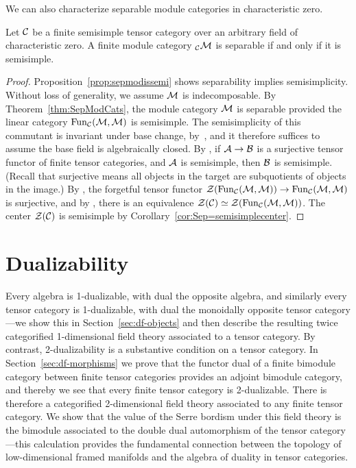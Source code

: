 \documentclass{amsart}
\begin{document}
We can also characterize separable module categories in characteristic zero.

\begin{proposition} \label{prop:SSModuleCatsAreSep}
Let $\mathcal C$ be a finite semisimple tensor category over an arbitrary field of characteristic zero.  A finite module category ${}_\mathcal C \mathcal M$ is separable if and only if it is semisimple.
\end{proposition}
\begin{proof}
Proposition~\ref{prop:sepmodissemi} shows separability implies semisimplicity.
Without loss of generality, we assume $\mathcal M$ is indecomposable.  By Theorem~\ref{thm:SepModCats}, the module category $\mathcal M$ is separable provided the linear category $\operatorname{Fun}_\mathcal C(\mathcal M,\mathcal M)$ is semisimple.  The semisimplicity of this commutant is invariant under base change, by~\cite[Lemma 5.2]{1002.0168}, and it therefore suffices to assume the base field is algebraically closed.  By \cite[Thm. 2.5]{EO-ftc}, if $\mathcal A \rightarrow \mathcal B$ is a surjective tensor functor of finite tensor categories, and $\mathcal A$ is semisimple, then $\mathcal B$ is semisimple.  (Recall that surjective means all objects in the target are subquotients of objects in the image.)  By \cite[Prop. 3.39]{EO-ftc}, the forgetful tensor functor $\mathcal Z(\operatorname{Fun}_\mathcal C(\mathcal M,\mathcal M)) \rightarrow \operatorname{Fun}_\mathcal C(\mathcal M,\mathcal M)$ is surjective, and by \cite[Cor. 3.35]{EO-ftc}, there is an equivalence $\mathcal Z(\mathcal C) \simeq \mathcal Z(\operatorname{Fun}_\mathcal C(\mathcal M,\mathcal M))$.  The center $\mathcal Z(\mathcal C)$ is semisimple by Corollary~\ref{cor:Sep=semisimplecenter}.
\end{proof}




\section{Dualizability} \label{sec:dualizability}


Every algebra is 1-dualizable, with dual the opposite algebra, and similarly every tensor category is 1-dualizable, with dual the monoidally opposite tensor category---we show this in Section~\ref{sec:df-objects} and then describe the resulting twice categorified 1-dimensional field theory associated to a tensor category.  By contrast, 2-dualizability is a substantive condition on a tensor category.  In Section~\ref{sec:df-morphisms} we prove that the functor dual of a finite bimodule category between finite tensor categories provides an adjoint bimodule category, and thereby we see that every finite tensor category is 2-dualizable.  There is therefore a categorified 2-dimensional field theory associated to any finite tensor category.  We show that the value of the Serre bordism under this field theory is the bimodule associated to the double dual automorphism of the tensor category---this calculation provides the fundamental connection between the topology of low-dimensional framed manifolds and the algebra of duality in tensor categories.  
\end{document}
